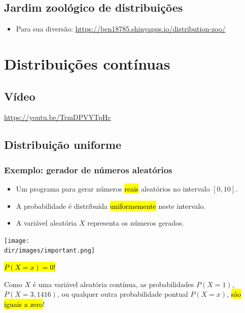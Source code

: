 \documentclass[
  11pt]{report}
\providecommand{\tightlist}{%
  \setlength{\itemsep}{0pt}\setlength{\parskip}{0pt}}
\newcommand{\dir}{/ssd/R/x86_64-pc-linux-gnu-library/4.3/fnaufelRmd/rmarkdown/resources}
\newenvironment{rmdimportant}
{
  \begin{myimportant}
    \texttt{[image: \\dir/images/important.png]}
    \tcblower
  }
  {
  \end{myimportant}
}
\begin{document}
\hypertarget{jardim-zooluxf3gico-de-distribuiuxe7uxf5es}{%
\section{Jardim zoológico de distribuições}\label{jardim-zooluxf3gico-de-distribuiuxe7uxf5es}}

\begin{itemize}
\tightlist
\item
  Para sua diversão: \url{https://ben18785.shinyapps.io/distribution-zoo/}
\end{itemize}

\hypertarget{distribuiuxe7uxf5es-contuxednuas}{%
\chapter{Distribuições contínuas}\label{distribuiuxe7uxf5es-contuxednuas}}

\hypertarget{vuxeddeo-4}{%
\section{Vídeo}\label{vuxeddeo-4}}

\begin{center} \url{https://youtu.be/TrmDPVYTpHc} \end{center}

\hypertarget{distribuiuxe7uxe3o-uniforme-1}{%
\section{Distribuição uniforme}\label{distribuiuxe7uxe3o-uniforme-1}}

\hypertarget{exemplo-gerador-de-nuxfameros-aleatuxf3rios}{%
\subsection{Exemplo: gerador de números aleatórios}\label{exemplo-gerador-de-nuxfameros-aleatuxf3rios}}

\begin{itemize}
\item
  Um programa para gerar números {\hl{reais}} aleatórios no intervalo $[0, 10]$.
\item
  A probabilidade é distribuída {\hl{uniformemente}} neste intervalo.
\item
  A variável aleatória $X$ representa os números gerados.
\end{itemize}

\begin{rmdimportant}
{\hl{$P(X = x) = 0!$}}

Como $X$ é uma variável aleatória contínua, as probabilidades
$P(X = 1)$, $P(X = 3{,}1416)$, ou qualquer outra probabilidade pontual
$P(X = x)$, {\hl{são iguais a zero}}!

\end{rmdimportant}
\end{document}
